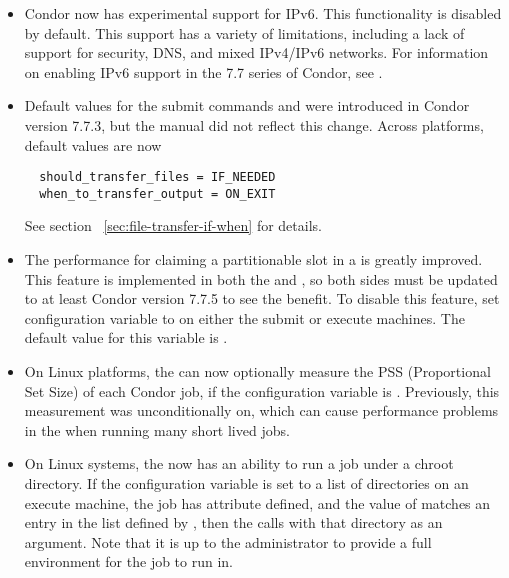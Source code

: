 \begin{itemize}

\item Condor now has experimental support for IPv6.  
This functionality is disabled by default.  
This support has a variety of limitations, 
including a lack of support for security, DNS, and mixed IPv4/IPv6 networks.  
For information on enabling IPv6 support in the 7.7 series of Condor, 
see .

\item Default values for the submit commands
 and 
were introduced in Condor version 7.7.3,
but the manual did not reflect this change.
Across platforms, default values are now
\begin{verbatim}
  should_transfer_files = IF_NEEDED
  when_to_transfer_output = ON_EXIT
\end{verbatim}
See section ~\ref{sec:file-transfer-if-when} for details.

\item The performance for claiming a partitionable slot in a 
 is greatly improved.  
This feature is implemented in both the  and ,
so both sides must be updated to at least Condor version 7.7.5 
to see the benefit.  
To disable this feature, set configuration variable
 to  
on either the submit or execute machines.  
The default value for this variable is .

\item On Linux platforms, the  can now optionally measure the
PSS (Proportional Set Size) of each Condor job,
if the configuration variable  is .
Previously, this measurement was unconditionally on,
which can cause performance problems in the  when running
many short lived jobs.

\item On Linux systems, the  now has an ability to run a 
job under a chroot directory.  
If the configuration variable  is set to a list
of directories on an execute machine, 
the job has attribute  defined,
and the value of  matches an entry 
in the list defined by ,
then the  calls  with that directory 
as an argument.  
Note that it is up to the administrator to provide a full environment 
for the job to run in.


\end{itemize}
